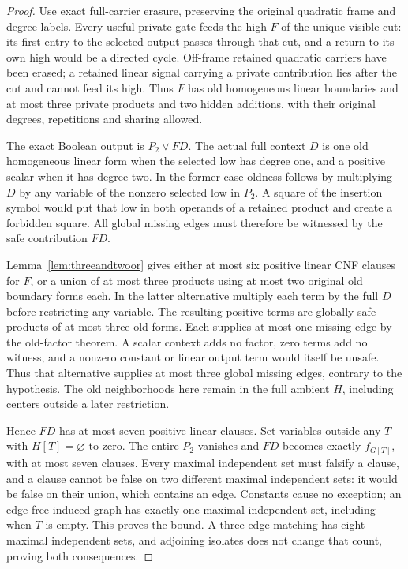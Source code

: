 \documentclass[11pt]{article}
\theoremstyle{definition}
\theoremstyle{remark}
\begin{document}
\begin{proof}
Use exact full-carrier erasure, preserving the original quadratic frame and degree labels. Every useful private gate feeds the high $F$ of the unique visible cut: its first entry to the selected output passes through that cut, and a return to its own high would be a directed cycle. Off-frame retained quadratic carriers have been erased; a retained linear signal carrying a private contribution lies after the cut and cannot feed its high. Thus $F$ has old homogeneous linear boundaries and at most three private products and two hidden additions, with their original degrees, repetitions and sharing allowed.

The exact Boolean output is $P_2\vee FD$. The actual full context $D$ is one old homogeneous linear form when the selected low has degree one, and a positive scalar when it has degree two. In the former case oldness follows by multiplying $D$ by any variable of the nonzero selected low in $P_2$. A square of the insertion symbol would put that low in both operands of a retained product and create a forbidden square. All global missing edges must therefore be witnessed by the safe contribution $FD$.

Lemma~\ref{lem:threeandtwoor} gives either at most six positive linear CNF clauses for $F$, or a union of at most three products using at most two original old boundary forms each. In the latter alternative multiply each term by the full $D$ before restricting any variable. The resulting positive terms are globally safe products of at most three old forms. Each supplies at most one missing edge by the old-factor theorem. A scalar context adds no factor, zero terms add no witness, and a nonzero constant or linear output term would itself be unsafe. Thus that alternative supplies at most three global missing edges, contrary to the hypothesis. The old neighborhoods here remain in the full ambient $H$, including centers outside a later restriction.

Hence $FD$ has at most seven positive linear clauses. Set variables outside any $T$ with $H[T]=\varnothing$ to zero. The entire $P_2$ vanishes and $FD$ becomes exactly $f_{G[T]}$, with at most seven clauses. Every maximal independent set must falsify a clause, and a clause cannot be false on two different maximal independent sets: it would be false on their union, which contains an edge. Constants cause no exception; an edge-free induced graph has exactly one maximal independent set, including when $T$ is empty. This proves the bound. A three-edge matching has eight maximal independent sets, and adjoining isolates does not change that count, proving both consequences.
\end{proof}
\end{document}

